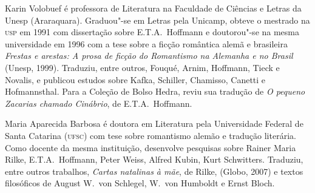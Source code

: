 \begin{resumopage}
\item[Karin Volobuef] é professora de Literatura na Faculdade de Ciências e
Letras da Unesp (Araraquara). Graduou"-se em Letras pela Unicamp, obteve
o mestrado na \textsc{usp} em 1991 com dissertação sobre E.T.A.~Hoffmann e doutorou"-se
na mesma universidade em 1996 com a tese sobre a ficção romântica alemã 
e brasileira \textit{Frestas e arestas: A prosa de ficção do Romantismo 
na Alemanha e no Brasil} (Unesp, 1999). Traduziu, entre outros, 
Fouqué, Arnim, Hoffmann, Tieck e Novalis, e publicou estudos sobre Kafka, 
Schiller, Chamisso, Canetti e Hofmannsthal. Para a Coleção de Bolso Hedra, 
reviu sua tradução de \textit{O pequeno Zacarias chamado Cinábrio}, de E.T.A.~Hoffmann. 

\item[Maria Aparecida Barbosa] é doutora em Literatura pela Universidade
Federal de Santa Catarina (\textsc{ufsc}) com tese sobre romantismo alemão e tradução 
literária. Como docente da mesma instituição, desenvolve pesquisas sobre Rainer 
Maria Rilke, E.T.A.~Hoffmann, Peter Weiss, Alfred Kubin, Kurt Schwitters. 
Traduziu, entre outros trabalhos, \textit{Cartas natalinas à mãe}, de Rilke, (Globo, 2007) 
e textos filosóficos de August W.~von Schlegel, W.~von Humboldt e Ernst Bloch.

\end{resumopage}

